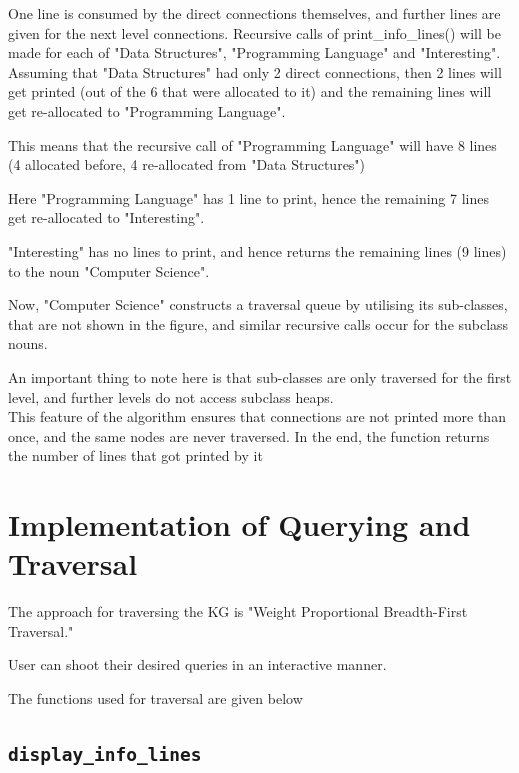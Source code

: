 \documentclass[conference]{IEEEtran}
\begin{document}
One line is consumed by the direct connections themselves, and further lines are given for the next level connections.
Recursive calls of print\_info\_lines() will be made for each of "Data Structures", "Programming Language" and "Interesting".\\

Assuming that "Data Structures" had only 2 direct connections, then 2 lines will get printed (out of the 6 that were allocated to it) and the remaining lines will get re-allocated to "Programming Language".

This means that the recursive call of "Programming Language" will have 8 lines (4 allocated before, 4 re-allocated from "Data Structures")

Here "Programming Language" has 1 line to print, hence the remaining 7 lines get re-allocated to "Interesting".

"Interesting" has no lines to print, and hence returns the remaining lines (9 lines) to the noun "Computer Science".

Now, "Computer Science" constructs a traversal queue by utilising its sub-classes, that are not shown in the figure, and similar recursive calls occur for the subclass nouns.

An important thing to note here is that sub-classes are only traversed for the first level, and further levels do not access subclass heaps.\\

This feature of the algorithm ensures that connections are not printed more than once, and the same nodes are never traversed.
In the end, the function returns the number of lines that got printed by it



\section{Implementation of Querying and Traversal}


The approach for traversing the KG is "Weight Proportional Breadth-First 
Traversal."

User can shoot their desired queries in an interactive manner. 

The functions used for traversal are given below 

\subsection{\textbf{\texttt{display\_info\_lines}}}
\end{document}
